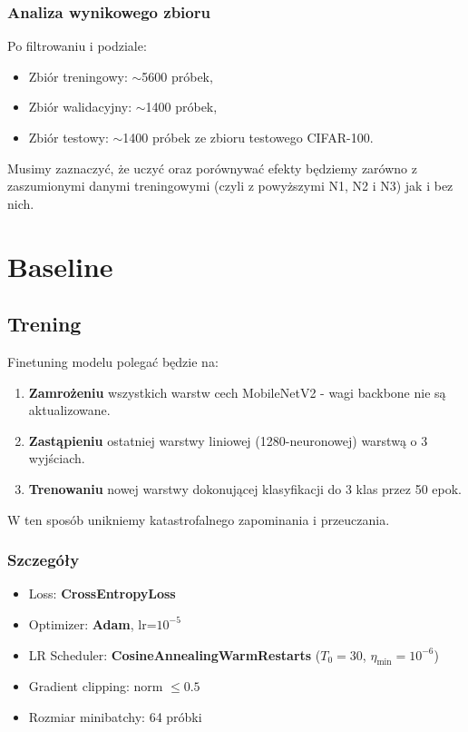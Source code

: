 \documentclass[12pt,twocolumn]{article}
\begin{document}
\subsubsection*{Analiza wynikowego zbioru}
Po filtrowaniu i podziale:
\begin{itemize}
  \item Zbiór treningowy: $\sim$5600 próbek,
  \item Zbiór walidacyjny: $\sim$1400 próbek,
  \item Zbiór testowy: $\sim$1400 próbek ze zbioru testowego CIFAR-100.
\end{itemize}

Musimy zaznaczyć, że uczyć oraz porównywać efekty będziemy zarówno z zaszumionymi danymi treningowymi
(czyli z powyższymi N1, N2 i N3) jak i bez nich.

\section{Baseline}
\label{sec:etap4}

\subsection{Trening}
Finetuning modelu polegać będzie na:
\begin{enumerate}
  \item \textbf{Zamrożeniu} wszystkich warstw cech MobileNetV2 - wagi backbone nie są aktualizowane.
  \item \textbf{Zastąpieniu} ostatniej warstwy liniowej (1280-neuronowej) warstwą o 3 wyjściach.
  \item \textbf{Trenowaniu} nowej warstwy dokonującej klasyfikacji do 3 klas przez 50 epok.
\end{enumerate}

W ten sposób unikniemy katastrofalnego zapominania i przeuczania.

\subsubsection*{Szczegóły}
\begin{itemize}
  \item Loss: \textbf{CrossEntropyLoss}
  \item Optimizer: \textbf{Adam}, lr=$10^{-5}$
  \item LR Scheduler: \textbf{CosineAnnealingWarmRestarts}
        ($T_0=30$, $\eta_{\min}=10^{-6}$)
  \item Gradient clipping: norm $\leq 0.5$
  \item Rozmiar minibatchy: 64 próbki
\end{itemize}
\end{document}

